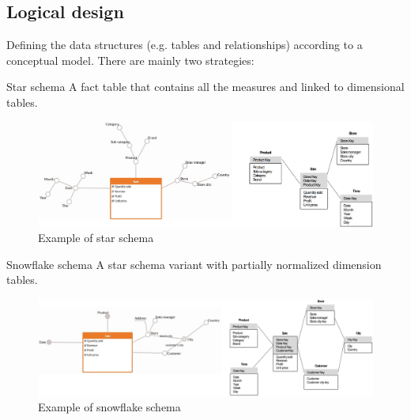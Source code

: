 \subsection{Logical design}
Defining the data structures (e.g. tables and relationships) according to a conceptual model.
There are mainly two strategies:
\begin{descriptionlist}
    \item[Star schema] 
        A fact table that contains all the measures and linked to dimensional tables.
        \begin{figure}[ht]
            \centering
            \includegraphics[width=\textwidth]{img/logical_star_schema.png}
            \caption{Example of star schema}
        \end{figure}

    \item[Snowflake schema] 
        A star schema variant with partially normalized dimension tables.
        \begin{figure}[ht]
            \centering
            \includegraphics[width=\textwidth]{img/logical_snowflake_schema.png}
            \caption{Example of snowflake schema}
        \end{figure}
\end{descriptionlist}